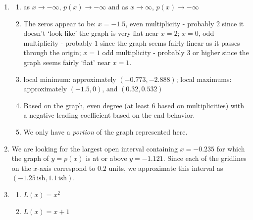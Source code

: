 \begin{enumerate}
\item \begin{enumerate}

\item  as $x \rightarrow -\infty$, $p(x) \rightarrow -\infty$ and as $x \rightarrow \infty$, $p(x) \rightarrow -\infty$

\item The zeros appear to be: $x=-1.5$, even multiplicity - probably $2$ since it doesn't `look like' the graph is very flat near $x = 2$;  $x=0$, odd multiplicity - probably $1$ since the graph seems fairly linear as it passes through the origin;  $x=1$ odd multiplicity - probably $3$ or higher since the graph seems fairly `flat' near $x = 1$.

\item  local minimum:  approximately $(-0.773, -2.888)$;  local maximums:  approximately $(-1.5,0)$, and $(0.32, 0.532)$

\item  Based on the graph, even degree (at least $6$ based on multiplicities) with a negative leading coefficient based on the end behavior.

\item  We only have a \textit{portion} of the graph represented here.

\end{enumerate}

\addtocounter{enumi}{1}

\item We are looking for the largest open interval containing $x = -0.235$ for which the graph of $y = p(x)$ is at or above $y=-1.121$.  Since each of the gridlines on the $x$-axis correspond to $0.2$ units, we approximate this interval as  $(-1.25 \, \text{ish}, 1.1 \, \text{ish})$.

\addtocounter{enumi}{4}

\item 

\begin{multicols}{2}
\begin{enumerate} \addtocounter{enumii}{2} 
\item $L(x) = x^2$


\item $L(x) = x+1$

\end{enumerate}
\end{multicols}

\end{enumerate}
